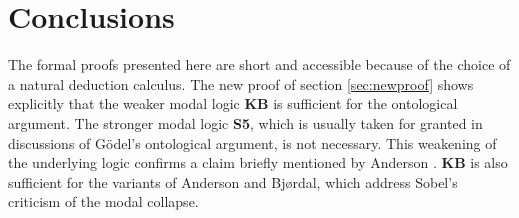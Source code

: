 \documentclass[smallextended]{svjour3}
\begin{document}

\section{Conclusions}

The formal proofs presented here are short and accessible because of the choice of a natural deduction calculus. The new proof of section \ref{sec:newproof} shows explicitly that the weaker modal logic {\bf KB} is sufficient for the ontological argument. The stronger modal logic {\bf S5}, which is usually taken for granted in discussions of G\"odel's ontological argument, is not necessary. This weakening of the underlying logic confirms a claim briefly mentioned by Anderson \citep[footnote 2]{and90}. {\bf KB} is also sufficient for the variants of Anderson and Bj{\o}rdal, which address Sobel's criticism of the modal collapse.
\end{document}
